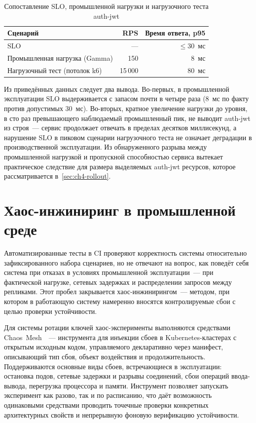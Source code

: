 \begin{table}[ht!]
  \centering
  \caption{Сопоставление SLO, промышленной нагрузки и нагрузочного теста auth-jwt}
  \label{tab:ch4-load-comparison}
  \begin{tabular}{lrr}
    \hline
    \textbf{Сценарий} & \textbf{RPS} & \textbf{Время ответа, p95} \\
    \hline
    SLO                           & ---     & $\leq 30$~мс \\
    Промышленная нагрузка (Gamma) & 150     & 8~мс \\
    Нагрузочный тест (потолок k6) & 15\,000 & 80~мс \\
    \hline
  \end{tabular}
\end{table}

Из приведённых данных следует два вывода.
Во-первых, в промышленной эксплуатации SLO выдерживается
с запасом почти в четыре раза
(8~мс по факту против допустимых 30~мс).
Во-вторых, кратное увеличение нагрузки до уровня,
в сто раз превышающего наблюдаемый промышленный пик,
не выводит auth-jwt из строя~---
сервис продолжает отвечать в пределах десятков миллисекунд,
а нарушение SLO в пиковом сценарии нагрузочного теста
не означает деградации в производственной эксплуатации.
Из обнаруженного разрыва между промышленной нагрузкой
и пропускной способностью сервиса вытекает практическое следствие
для размера выделяемых auth-jwt ресурсов, которое рассматривается
в~\ref{sec:ch4-rollout}.

\section{Хаос-инжиниринг в промышленной среде}\label{sec:ch4-chaos}

Автоматизированные тесты в CI проверяют корректность системы
относительно зафиксированного набора сценариев,
но не отвечают на вопрос, как поведёт себя система
при отказах в условиях промышленной эксплуатации~---
при фактической нагрузке, сетевых задержках и распределении
запросов между репликами.
Этот пробел закрывается хаос-инжинирингом~---
методом, при котором в работающую систему намеренно вносятся
контролируемые сбои с целью проверки устойчивости.

Для системы ротации ключей хаос-эксперименты выполняются
средствами Chaos~Mesh~\cite{ChaosMesh}~---
инструмента для инъекции сбоев в Kubernetes-кластерах
с открытым исходным кодом,
управляемого декларативно через манифест,
описывающий тип сбоя, объект воздействия и продолжительность.
Поддерживаются основные виды сбоев,
встречающиеся в эксплуатации:
остановка подов, сетевые задержки и разрывы соединений,
сбои операций ввода-вывода, перегрузка процессора и памяти.
Инструмент позволяет запускать эксперимент как разово,
так и по расписанию,
что даёт возможность одинаковыми средствами
проводить точечные проверки конкретных архитектурных свойств
и непрерывную фоновую верификацию устойчивости.

